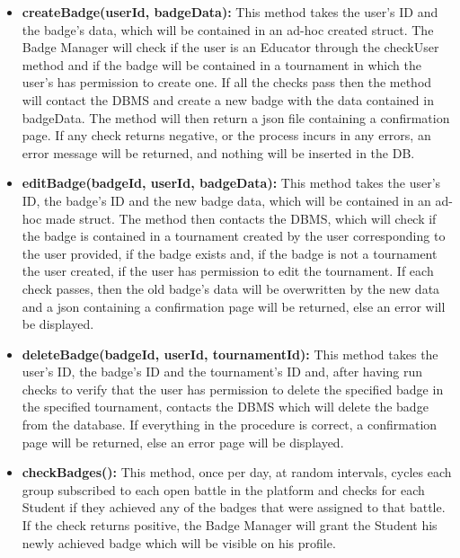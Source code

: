 \documentclass{article}
\begin{document}
{\begin{itemize}
\begin{itemize}
        user has created any badges and returns the json containing the new page to display, containing all the user's created badges. 
        If no badges are found, the json returned will be an empty page.
        \item \textbf{createBadge(userId, badgeData):} This method takes the user's ID and the badge's data, which will be contained in an ad-hoc
        created struct. The Badge Manager will check if the user is an Educator through the checkUser method and if the badge will be contained in a tournament in which 
        the user's has permission to create one. If all the checks pass then the method will contact the DBMS and create a new badge with the data contained in badgeData. 
        The method will then return a json file containing a confirmation page. 
        If any check returns negative, or the process incurs in any errors, an error message will be returned, and nothing will be inserted in the DB.
        \item \textbf{editBadge(badgeId, userId, badgeData):} This method takes the user's ID, the badge's ID and the new badge data, which will be
        contained in an ad-hoc made struct. The method then contacts the DBMS, which will check if the badge is contained in a tournament created by
        the user corresponding to the user provided, if the badge exists and, if the badge is not a tournament the user created, if the user has
        permission to edit the tournament. If each check passes, then the old badge's data will be overwritten by the new data and a json containing
        a confirmation page will be returned, else an error will be displayed.
        \item \textbf{deleteBadge(badgeId, userId, tournamentId):} This method takes the user's ID, the badge's ID and the tournament's ID and, 
        after having run checks to verify that the user has permission to delete the specified badge in the specified tournament, contacts the DBMS which will
        delete the badge from the database.
        If everything in the procedure is correct, a confirmation page will be returned, else an error page will be displayed.
        \item \textbf{checkBadges():} This method, once per day, at random intervals, cycles each group subscribed to each open battle in the platform and checks for each
        Student if they achieved any of the badges that were assigned to that battle. If the check returns positive, the Badge Manager will grant the Student his newly 
        achieved badge which will be visible on his profile.

\end{itemize}
\end{itemize}}
\end{document}
